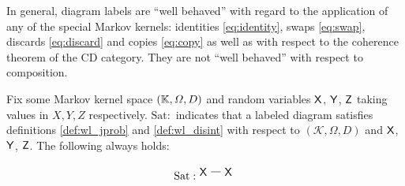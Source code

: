 \begin{lemma}

In general, diagram labels are ``well behaved'' with regard to the application of any of the special Markov kernels: identities \ref{eq:identity}, swaps \ref{eq:swap}, discards \ref{eq:discard} and copies \ref{eq:copy} as well as with respect to the coherence theorem of the CD category. They are not ``well behaved'' with respect to composition.

Fix some Markov kernel space $(\mathbb{K},\Omega,D)$ and random variables $\mathsf{X}$, $\mathsf{Y}$, $\mathsf{Z}$ taking values in $X,Y,Z$ respectively. $\mathrm{Sat:}$ indicates that a labeled diagram satisfies definitions \ref{def:wl_jprob} and \ref{def:wl_disint} with respect to $(\mathscr{K},\Omega,D)$ and $\mathsf{X}$, $\mathsf{Y}$, $\mathsf{Z}$.  The following always holds:

\begin{align}
\mathrm{Sat:}
\begin{tikzpicture}
\path (0,0) node (A) {$\RV{X}$}
++(0.8,0) node (X) {$\RV{X}$};
\draw (A) -- (X);
\end{tikzpicture}
\end{align}


\end{lemma}
